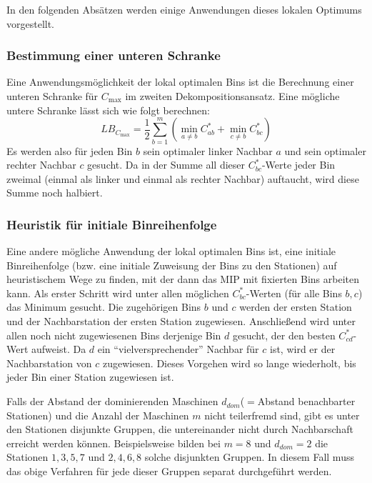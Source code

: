 \documentclass{scrreprt}
\begin{document}
In den folgenden Absätzen werden einige Anwendungen dieses lokalen Optimums vorgestellt.

\subsubsection{Bestimmung einer unteren Schranke}
Eine Anwendungsmöglichkeit der lokal optimalen Bins ist die Berechnung einer unteren Schranke für $C_{\max}$ im zweiten Dekompositionsansatz.
Eine mögliche untere Schranke lässt sich wie folgt berechnen:
\[LB_{C_{\max}} = \frac{1}{2} \sum_{b=1}^m \left( \min_{a\neq b} C_{ab}^* + \min_{c\neq b} C_{bc}^* \right) \]
Es werden also für jeden Bin $b$ sein optimaler linker Nachbar $a$ und sein optimaler rechter Nachbar $c$ gesucht.
Da in der Summe all dieser $C_{bc}^*$-Werte jeder Bin zweimal (einmal als linker und einmal als rechter Nachbar) auftaucht,
wird diese Summe noch halbiert.

\subsubsection{Heuristik für initiale Binreihenfolge}
Eine andere mögliche Anwendung der lokal optimalen Bins ist, eine initiale Binreihenfolge (bzw. eine initiale Zuweisung der Bins zu den Stationen)
auf heuristischem Wege zu finden, mit der dann das MIP mit fixierten Bins arbeiten kann.
Als erster Schritt wird unter allen möglichen $C_{bc}^*$-Werten (für alle Bins $b,c$) das Minimum gesucht.
Die zugehörigen Bins $b$ und $c$ werden der ersten Station und der Nachbarstation der ersten Station zugewiesen.
Anschließend wird unter allen noch nicht zugewiesenen Bins derjenige Bin $d$ gesucht, der den besten $C_{cd}^*$-Wert aufweist.
Da $d$ ein "`vielversprechender"' Nachbar für $c$ ist, wird er der Nachbarstation von $c$ zugewiesen.
Dieses Vorgehen wird so lange wiederholt, bis jeder Bin einer Station zugewiesen ist.

Falls der Abstand der dominierenden Maschinen $d_{\mathit{dom}}$($=$Abstand benachbarter Stationen) und die Anzahl der Maschinen $m$ nicht teilerfremd sind,
gibt es unter den Stationen disjunkte Gruppen, die untereinander nicht durch Nachbarschaft erreicht werden können.
Beispielsweise bilden bei $m=8$ und $d_{\mathit{dom}}=2$ die Stationen $1,3,5,7$ und $2,4,6,8$ solche disjunkten Gruppen.
In diesem Fall muss das obige Verfahren für jede dieser Gruppen separat durchgeführt werden.
\end{document}
